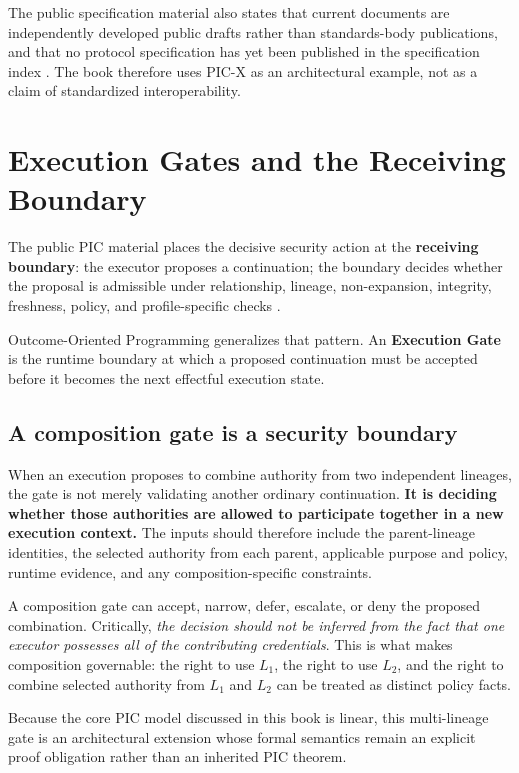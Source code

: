 \documentclass[10pt,oneside,openany]{book}
\newcommand{\term}[1]{\textbf{#1}}
\begin{document}
The public specification material also states that current documents are independently developed public drafts rather than standards-body publications, and that no protocol specification has yet been published in the specification index \cite{picspec,picprotocols}. The book therefore uses PIC-X as an architectural example, not as a claim of standardized interoperability.

\chapter{Execution Gates and the Receiving Boundary}

The public PIC material places the decisive security action at the \term{receiving boundary}: the executor proposes a continuation; the boundary decides whether the proposal is admissible under relationship, lineage, non-expansion, integrity, freshness, policy, and profile-specific checks \cite{picwhy}.

Outcome-Oriented Programming generalizes that pattern. An \term{Execution Gate} is the runtime boundary at which a proposed continuation must be accepted before it becomes the next effectful execution state.

\section{A composition gate is a security boundary}
When an execution proposes to combine authority from two independent lineages, the gate is not merely validating another ordinary continuation. \textbf{It is deciding whether those authorities are allowed to participate together in a new execution context.} The inputs should therefore include the parent-lineage identities, the selected authority from each parent, applicable purpose and policy, runtime evidence, and any composition-specific constraints.

A composition gate can accept, narrow, defer, escalate, or deny the proposed combination. Critically, \emph{the decision should not be inferred from the fact that one executor possesses all of the contributing credentials}. This is what makes composition governable: the right to use $L_1$, the right to use $L_2$, and the right to combine selected authority from $L_1$ and $L_2$ can be treated as distinct policy facts.

Because the core PIC model discussed in this book is linear, this multi-lineage gate is an architectural extension whose formal semantics remain an explicit proof obligation rather than an inherited PIC theorem.
\end{document}
